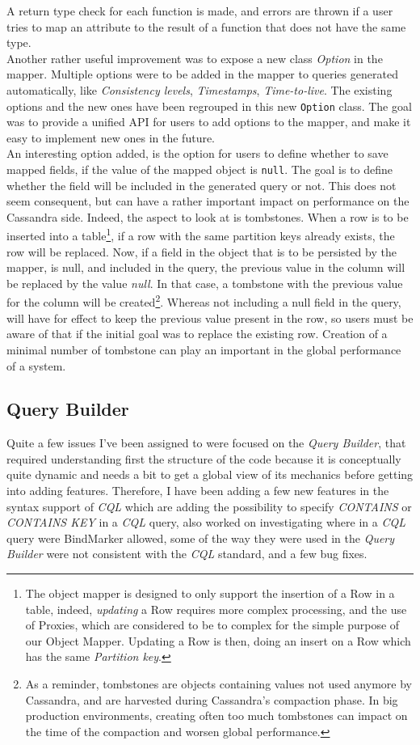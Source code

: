 \documentclass[a4paper]{report}
\begin{document}
A return type check for each function is made, and errors are thrown if a user tries to map an attribute to the result of a function that does not have the same type.\\
Another rather useful improvement was to expose a new class \emph{Option} in the mapper. Multiple options were to be added in the mapper to queries generated automatically, like \emph{Consistency levels}, \emph{Timestamps}, \emph{Time-to-live}. The existing options and the new ones have been regrouped in this new \verb;Option; class. The goal was to provide a unified API for users to add options to the mapper, and make it easy to implement new ones in the future.\\
An interesting option added, is the option for users to define whether to save mapped fields, if the value of the mapped object is \verb;null;. The goal is to define whether the field will be included in the generated query or not. This does not seem consequent, but can have a rather important impact on performance on the Cassandra side. Indeed, the aspect to look at is tombstones. When a row is to be inserted into a table\footnote{The object mapper is designed to only support the insertion of a Row in a table, indeed, \emph{updating} a Row requires more complex processing, and the use of Proxies, which are considered to be to complex for the simple purpose of our Object Mapper. Updating a Row is then, doing an insert on a Row which has the same \emph{Partition key}.}, if a row with the same partition keys already exists, the row will be replaced. Now, if a field in the object that is to be persisted by the mapper, is null, and included in the query, the previous value in the column will be replaced by the value \emph{null}. In that case, a tombstone with the previous value for the column will be created\footnote{As a reminder, tombstones are objects containing values not used anymore by Cassandra, and are harvested during Cassandra's compaction phase. In big production environments, creating often too much tombstones can impact on the time of the compaction and worsen global performance.}. Whereas not including a null field in the query, will have for effect to keep the previous value present in the row, so users must be aware of that if the initial goal was to replace the existing row. Creation of a minimal number of tombstone can play an important in the global performance of a system.

\subsection{Query Builder}
Quite a few issues I've been assigned to were focused on the \emph{Query Builder}, that required understanding first the structure of the code because it is conceptually quite dynamic and needs a bit to get a global view of its mechanics before getting into adding features. Therefore, I have been adding a few new features in the syntax support of \emph{CQL} which are adding the possibility to specify \emph{CONTAINS} or \emph{CONTAINS KEY} in a \emph{CQL} query, also worked on investigating where in a \emph{CQL} query were BindMarker allowed, some of the way they were used in the \emph{Query Builder} were not consistent with the \emph{CQL} standard, and a few bug fixes.
\end{document}
